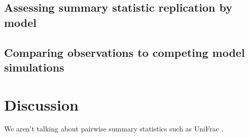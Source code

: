 \documentclass{article}
\begin{document}
\subsection*{Assessing summary statistic replication by model}

\subsection*{Comparing observations to competing model simulations}

\section{Discussion}
We aren't talking about pairwise summary statistics such as UniFrac \cite{De_Bourcy2017-pu}.




\end{document}
